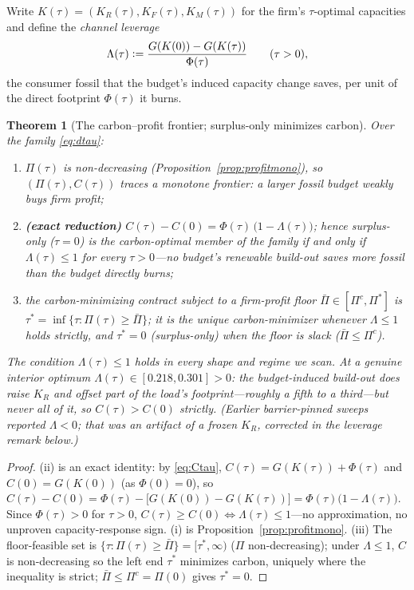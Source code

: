 \documentclass[11pt,reqno]{amsart}
\theoremstyle{plain}
\newtheorem{theorem}{Theorem}
\theoremstyle{definition}
\theoremstyle{remark}
\newcommand{\KR}{K_R}
\newcommand{\KF}{K_F}
\newcommand{\KM}{K_M}
\newcommand{\eqdef}{\vcentcolon=}
\begin{document}
Write $K(\tau)=(\KR(\tau),\KF(\tau),\KM(\tau))$ for the firm's $\tau$-optimal capacities
and define the \emph{channel leverage}
\begin{equation}\label{eq:leverage}
  \Lambda(\tau)\eqdef\frac{G(K(0))-G(K(\tau))}{\Phi(\tau)}\qquad(\tau>0),
\end{equation}
the consumer fossil that the budget's induced capacity change saves, per unit of the
direct footprint $\Phi(\tau)$ it burns.

\begin{theorem}[The carbon--profit frontier; surplus-only minimizes carbon]\label{thm:frontier}
Over the family \eqref{eq:dtau}:
\begin{enumerate}[leftmargin=2em,itemsep=1pt]
\item[\textup{(i)}] $\Pi(\tau)$ is non-decreasing (Proposition~\ref{prop:profitmono}), so
$(\Pi(\tau),C(\tau))$ traces a monotone frontier: a larger fossil budget weakly buys firm
profit;
\item[\textup{(ii)}] \textbf{(exact reduction)} $C(\tau)-C(0)=\Phi(\tau)\,\big(1-\Lambda(\tau)\big)$;
hence surplus-only ($\tau=0$) is the carbon-optimal member of the family \emph{if and only
if} $\Lambda(\tau)\le1$ for every $\tau>0$---no budget's renewable build-out saves more
fossil than the budget directly burns;
\item[\textup{(iii)}] the carbon-minimizing contract subject to a firm-profit floor
$\bar\Pi\in[\Pi^{c},\Pi^{*}]$ is $\tau^{*}=\inf\{\tau:\Pi(\tau)\ge\bar\Pi\}$; it is the
unique carbon-minimizer whenever $\Lambda\le1$ holds strictly, and $\tau^{*}=0$
(surplus-only) when the floor is slack ($\bar\Pi\le\Pi^{c}$).
\end{enumerate}
The condition $\Lambda(\tau)\le1$ holds in every shape and regime we scan. At a genuine
interior optimum $\Lambda(\tau)\in[0.218,0.301]>0$: the budget-induced build-out \emph{does}
raise $\KR$ and offset part of the load's footprint---roughly a fifth to a third---but never
all of it, so $C(\tau)>C(0)$ strictly. (Earlier barrier-pinned sweeps reported $\Lambda<0$;
that was an artifact of a frozen $\KR$, corrected in the leverage remark below.)
\end{theorem}
\begin{proof}
(ii) is an exact identity: by \eqref{eq:Ctau}, $C(\tau)=G(K(\tau))+\Phi(\tau)$ and
$C(0)=G(K(0))$ (as $\Phi(0)=0$), so
$C(\tau)-C(0)=\Phi(\tau)-\big[G(K(0))-G(K(\tau))\big]=\Phi(\tau)\big(1-\Lambda(\tau)\big)$.
Since $\Phi(\tau)>0$ for $\tau>0$, $C(\tau)\ge C(0)\Leftrightarrow\Lambda(\tau)\le1$---no
approximation, no unproven capacity-response sign. (i) is Proposition~\ref{prop:profitmono}.
(iii) The floor-feasible set is $\{\tau:\Pi(\tau)\ge\bar\Pi\}=[\tau^{*},\infty)$ ($\Pi$
non-decreasing); under $\Lambda\le1$, $C$ is non-decreasing so the left end $\tau^{*}$
minimizes carbon, uniquely where the inequality is strict; $\bar\Pi\le\Pi^{c}=\Pi(0)$
gives $\tau^{*}=0$.
\end{proof}
\end{document}
